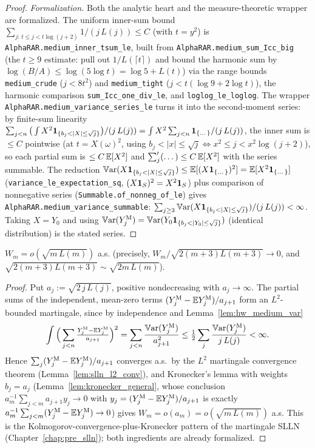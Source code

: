 \begin{proof}
\emph{Formalization.} Both the analytic heart and the measure-theoretic wrapper are formalized.
The uniform inner-sum bound $\sum_{j:\,t\le j<t\log(j+2)}1/(j\,L(j))\le C$ (with $t=y^2$) is
\texttt{AlphaRAR.medium\_inner\_tsum\_le}, built from \texttt{AlphaRAR.medium\_sum\_Icc\_big} (the
$t\ge9$ estimate: pull out $1/L(\lceil t\rceil)$ and bound the harmonic sum by
$\log(B/A)\le\log(5\log t)=\log5+L(t)$) via the range bounds \texttt{medium\_crude} ($j<8t^2$) and
\texttt{medium\_tight} ($j<t(\log9+2\log t)$), the harmonic comparison
\texttt{sum\_Icc\_one\_div\_le}, and \texttt{loglog\_le\_loglog}. The wrapper
\texttt{AlphaRAR.medium\_variance\_series\_le} turns it into the second-moment series: by finite-sum
linearity $\sum_{j<n}\big(\int X^2\indic_{\{b_j<|X|\le\sqrt j\}}\big)/(j\,L(j))=\int X^2\sum_{j<n}
\indic_{\{\dots\}}/(j\,L(j))$, the inner sum is $\le C$ pointwise (at $t=X(\omega)^2$, using
$b_j<|x|\le\sqrt j\iff x^2\le j<x^2\log(j+2)$), so each partial sum is $\le C\,\mathbb{E}[X^2]$ and
$\sum'_j(\dots)\le C\,\mathbb{E}[X^2]$ with the series summable. The reduction
$\Var(X\indic_{\{b_j<|X|\le\sqrt j\}})\le\E[(X\indic_{\{\dots\}})^2]=\E[X^2\indic_{\{\dots\}}]$
(\texttt{variance\_le\_expectation\_sq}, $(X\mathbf{1}_S)^2=X^2\mathbf{1}_S$) plus comparison of nonnegative
series (\texttt{Summable.of\_nonneg\_of\_le}) gives \texttt{AlphaRAR.medium\_variance\_summable}:
$\sum_{j\ge3}\Var(X\indic_{\{b_j<|X|\le\sqrt j\}})/(j\,L(j))<\infty$. Taking $X=Y_0$ and using
$\Var(Y_j^{\mathrm M})=\Var(Y_0\indic_{\{b_j<|Y_0|\le\sqrt j\}})$ (identical distribution) is the
stated series.
\end{proof}

\begin{lemma}\label{lem:hw_medium}
\leanok
{}
$W_m=o(\sqrt{m\,L(m)})$ a.s. (precisely, $W_m/\sqrt{2(m+3)L(m+3)}\to0$, and
$\sqrt{2(m+3)L(m+3)}\sim\sqrt{2m\,L(m)}$).
\end{lemma}
\begin{proof}
Put $a_j:=\sqrt{2\,j\,L(j)}$, positive nondecreasing with $a_j\to\infty$. The partial
sums of the independent, mean-zero terms $(Y_j^{\mathrm M}-\mathbb{E} Y_j^{\mathrm M})/a_{j+1}$
form an $L^2$-bounded martingale, since by independence and Lemma~\ref{lem:hw_medium_var}
\[
  \int\Big(\sum_{j<n}\tfrac{Y_j^{\mathrm M}-\mathbb{E} Y_j^{\mathrm M}}{a_{j+1}}\Big)^2
  =\sum_{j<n}\frac{\mathbb{V}\mathrm{ar}(Y_j^{\mathrm M})}{a_{j+1}^2}
  \le\tfrac12\sum_{j}\frac{\mathbb{V}\mathrm{ar}(Y_j^{\mathrm M})}{j\,L(j)}<\infty .
\]
Hence $\sum_j(Y_j^{\mathrm M}-\mathbb{E} Y_j^{\mathrm M})/a_{j+1}$ converges a.s.\ by the $L^2$
martingale convergence theorem (Lemma~\ref{lem:slln_l2_conv}), and Kronecker's lemma with
weights $b_j=a_j$ (Lemma~\ref{lem:kronecker_general}, whose conclusion
$a_m^{-1}\sum_{j<m}a_{j+1}y_j\to0$ with $y_j=(Y_j^{\mathrm M}-\mathbb{E} Y_j^{\mathrm M})/a_{j+1}$
is exactly $a_m^{-1}\sum_{j<m}(Y_j^{\mathrm M}-\mathbb{E} Y_j^{\mathrm M})\to0$) gives
$W_m=o(a_m)=o(\sqrt{m\,L(m)})$ a.s. This is the Kolmogorov-convergence-plus-Kronecker
pattern of the martingale SLLN (Chapter~\ref{chap:pre_slln}); both ingredients are
already formalized.
\end{proof}

